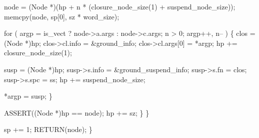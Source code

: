             node = (Node *)(hp + n * (closure_node_size(1) + suspend_node_size));
            memcpy(node, sp[0], sz * word_size);

            for ( argp = is_vect ? node->a.args : node->c.args;
                  n > 0; 
                  argp++, n-- )
            \{
                clos             = (Node *)hp;
                clos->cl.info    = &ground_info;
                clos->cl.args[0] = *argp;
                hp              += closure_node_size(1);

                susp         = (Node *)hp;
                susp->s.info = &ground_suspend_info;
                susp->s.fn   = clos;
                susp->s.spc  = ss;
                hp          += suspend_node_size;

                *argp = susp;
            \}

            ASSERT((Node *)hp == node);
            hp  += sz;
        \}
    \}

    sp += 1;
    RETURN(node);
\}
\nwendcode{}

%
%

